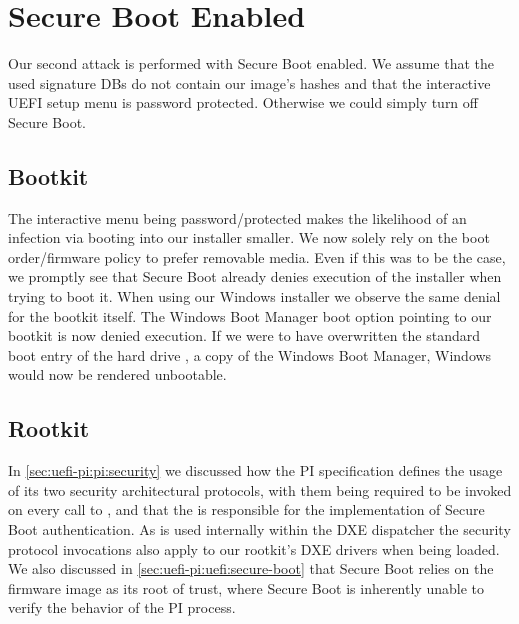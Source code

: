 
\section{Secure Boot Enabled}
\label{sec:attacks:secure-boot}

Our second attack is performed with Secure Boot enabled.
We assume that the used signature \acp{DB} do not contain our image's hashes and that the interactive \ac{UEFI} setup menu is password protected.
Otherwise we could simply turn off Secure Boot.

\subsection{Bootkit}

The interactive menu being password\-/protected makes the likelihood of an infection via booting into our installer smaller.
We now solely rely on the boot order/firmware policy to prefer removable media.
Even if this was to be the case, we promptly see that Secure Boot already denies execution of the installer when trying to boot it.
When using our Windows installer we observe the same denial for the bootkit itself.
The Windows Boot Manager boot option pointing to our bootkit is now denied execution.
If we were to have overwritten the standard boot entry of the hard drive , a copy of the Windows Boot Manager, Windows would now be rendered unbootable.

\subsection{Rootkit}

In \autoref{sec:uefi-pi:pi:security} we discussed how the \ac{PI} specification defines the usage of its two security architectural protocols, with them being required to be invoked on every call to , and that the  is responsible for the implementation of Secure Boot authentication.
As  is used internally within the \ac{DXE} dispatcher the security protocol invocations also apply to our rootkit's \ac{DXE} drivers when being loaded.
We also discussed in \autoref{sec:uefi-pi:uefi:secure-boot} that Secure Boot relies on the firmware image as its root of trust, where Secure Boot is inherently unable to verify the behavior of the \ac{PI} process.

